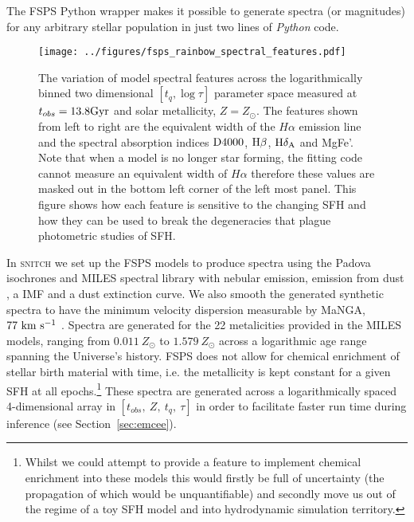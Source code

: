 \documentclass[useAMS,usenatbib]{mn2e}
\begin{document}
The FSPS Python wrapper makes it possible to generate spectra (or magnitudes) for any arbitrary stellar population in just two lines of \emph{Python} code. 


\begin{figure*}
\centering
\texttt{[image: ../figures/fsps\_rainbow\_spectral\_features.pdf]}
\caption{The variation of model spectral features across the logarithmically binned two dimensional $[t_q, \log \tau]$ parameter space measured at $t_{obs}=13.8\rm{Gyr}$ and solar metallicity, $Z=Z_{\odot}$. The features shown from left to right are the equivalent width of the $H\alpha$ emission line and the spectral absorption indices $\rm{D}4000$, $\rm{H}\beta$, $\rm{H}\delta_A$ and MgFe'. Note that when a model is no longer star forming, the fitting code cannot measure an equivalent width of $H\alpha$ therefore these values are masked out in the bottom left corner of the left most panel. This figure shows how each feature is sensitive to the changing SFH and how they can be used to break the degeneracies that plague photometric studies of SFH. }
\label{fig:rainbow}
\end{figure*}



In \textsc{snitch} we set up the FSPS models to produce spectra using the Padova isochrones \citep{girardi02} and MILES spectral library \citep{vazdekis16} with nebular emission, emission from dust \cite{draineli07}, a \cite{chabrier03} IMF and a \cite{calzetti00} dust extinction curve. We also smooth the generated synthetic spectra to have the minimum velocity dispersion measurable by MaNGA, $77~\rm{km}~{s}^{-1}$ \citep{bundy15}. Spectra are generated for the 22 metalicities provided in the MILES models, ranging from $0.011~Z_{\odot}$ to $1.579~Z_{\odot}$ across a logarithmic age range spanning the Universe's history. FSPS does not allow for chemical enrichment of stellar birth material with time, i.e. the metallicity is kept constant for a given SFH at all epochs.\footnote{Whilst we could attempt to provide a feature to implement chemical enrichment into these models this would firstly be full of uncertainty (the propagation of which would be unquantifiable) and secondly move us out of the regime of a toy SFH model and into hydrodynamic simulation territory. } These spectra are generated across a logarithmically spaced 4-dimensional array in $[t_{obs},~Z,~t_q,~\tau]$ in order to facilitate faster run time during inference (see Section~\ref{sec:emcee}).
\end{document}

